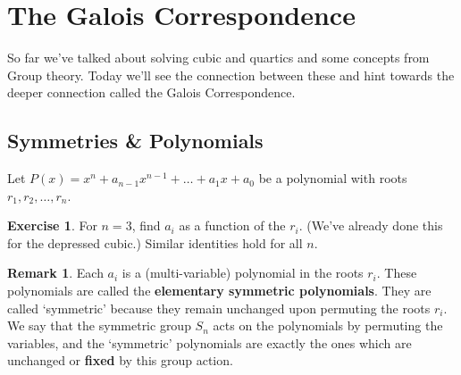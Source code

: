 \documentclass[reqno, 12pt, letter]{article}
\theoremstyle{plain}
\theoremstyle{definition}
\newtheorem{remark}[theorem]{Remark}
\newtheorem{exercise}[theorem]{Exercise}
\theoremstyle{remark}
\numberwithin{equation}{section}
\begin{document}
\newpage
\section{The Galois Correspondence}
So far we've talked about solving cubic and quartics and some concepts from Group theory. Today we'll see the connection between these and hint towards the deeper connection called the Galois Correspondence.

\subsection{Symmetries \& Polynomials}

Let $ P(x) = x^n + a_{n-1} x^{n-1} + \dots + a_1 x + a_0$ be a polynomial with roots $ r_1, r_2, \dots, r_n$.

\begin{exercise}
	\label{exercise:elementary-symmetric-functions}
	For $ n=3$, find $ a_i$ as a function of the $ r_i$. (We've already done this for the depressed cubic.) Similar identities hold for all $ n$.
\end{exercise}
\begin{remark}
	Each $ a_i$ is a (multi-variable) polynomial in the roots $ r_i$. These polynomials are called the \textbf{elementary symmetric polynomials}. They are called `symmetric' because they remain unchanged upon permuting the roots $ r_i$. We say that the symmetric group $S_n$ acts on the polynomials by permuting the variables, and the `symmetric' polynomials are exactly the ones which are unchanged or \textbf{fixed} by this group action.
\end{remark}
\end{document}
